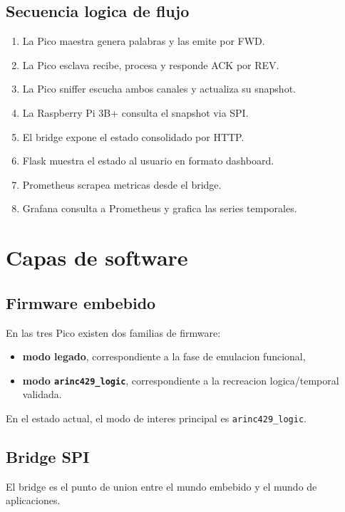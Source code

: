 \documentclass[12pt,a4paper]{report}
\begin{document}
\section{Secuencia logica de flujo}

\begin{enumerate}
    \item La Pico maestra genera palabras y las emite por FWD.
    \item La Pico esclava recibe, procesa y responde ACK por REV.
    \item La Pico sniffer escucha ambos canales y actualiza su snapshot.
    \item La Raspberry Pi 3B+ consulta el snapshot via SPI.
    \item El bridge expone el estado consolidado por HTTP.
    \item Flask muestra el estado al usuario en formato dashboard.
    \item Prometheus scrapea metricas desde el bridge.
    \item Grafana consulta a Prometheus y grafica las series temporales.
\end{enumerate}

\chapter{Capas de software}

\section{Firmware embebido}

En las tres Pico existen dos familias de firmware:

\begin{itemize}
    \item \textbf{modo legado}, correspondiente a la fase de emulacion funcional,
    \item \textbf{modo \texttt{arinc429\_logic}}, correspondiente a la recreacion logica/temporal validada.
\end{itemize}

En el estado actual, el modo de interes principal es \texttt{arinc429\_logic}.

\section{Bridge SPI}

El bridge es el punto de union entre el mundo embebido y el mundo de aplicaciones.
\end{document}
